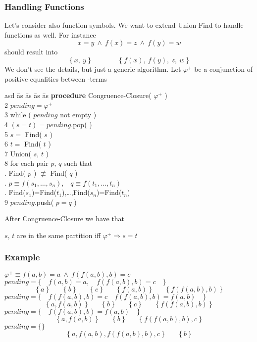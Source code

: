 \begin{frame}
  \frametitle{Handling Functions}

  \scriptsize

  Let's consider also function symbols. We want to extend Union-Find
  to handle functions as well. For instance 
  $$x=y\ \wedge\ f(x)=z\ \wedge\ f(y)=w$$
  should result into
  $$
  \{\ x,\ y\ \}\quad\quad\quad\quad\{\ f(x),\ f(y),\ z,\ w\ \}
  $$
  \vfill\pause
  We don't see the details, but just a generic algorithm. Let 
  $\varphi^+$ be a conjunction of positive equalities between \Uf-terms
  \begin{tabbing}
  asd \= as \= as \= as \= as  \> {\bf procedure} Congruence-Closure( $\varphi^+$ ) \\
  2 \> $pending = \varphi^+$ \\
  3 \> while ( $pending$ not empty ) \\  
  4 \> \> $(s = t) = pending$.pop( ) \\
  5 \> \> $s =$ Find( $s$ ) \\
  6 \> \> $t =$ Find( $t$ ) \\
  7 \> \> Union( $s$, $t$ ) \\
  8 \> \> for each pair $p$, $q$ such that\\
    \> \> \> . Find( $p$ ) $\not\equiv$ Find( $q$ ) \\
    \> \> \> . $p \equiv f( s_1, \ldots, s_n )$,\ \ $q \equiv f( t_1, \ldots, t_n )$ \\
    \> \> \> . Find($s_1$)=Find($t_1$),\ldots,Find($s_n$)=Find($t_n$) \\
  9 \> \> \> $pending$.push( $p=q$ ) \\
 \end{tabbing}
 \vfill\pause
 After Congruence-Closure we have that
 \begin{center}
   $s$, $t$ are in the same partition iff $\varphi^+ \Rightarrow s=t$
 \end{center}

\end{frame}

\begin{frame}
  \frametitle{Example}

  \scriptsize

 $\varphi^+ \equiv f(a,b)=a\ \wedge\ f(f(a,b),b)=c$
 \vfill
 $pending = \{\quad f(a,b)=a,\quad f(f(a,b),b)=c\quad \}$ 
 $$
 \{\ a\ \}\quad\quad\{\ b\ \}\quad\quad\{\ c\ \}\quad\quad\{\ f(a,b)\ \}\quad\quad\{\ f(f(a,b),b)\ \}
 $$
 \vfill
 $pending = \{\quad f(f(a,b),b)=c\quad f(f(a,b),b)=f(a,b)\quad \}$ 
 $$
 \{\ a, f(a,b)\ \}\quad\quad\{\ b\ \}\quad\quad\{\ c\ \}\quad\quad\{\ f(f(a,b),b)\ \}
 $$
 \vfill
 $pending = \{\quad f(f(a,b),b)=f(a,b)\quad \}$ 
 $$
 \{\ a, f(a,b)\ \}\quad\quad\{\ b\ \}\quad\quad\{\ f(f(a,b),b), c\ \}
 $$
 \vfill
 $pending = \{ \}$ 
 $$
 \{\ a, f(a,b), f(f(a,b),b), c\ \}\quad\quad\{\ b\ \}
 $$

\end{frame}

